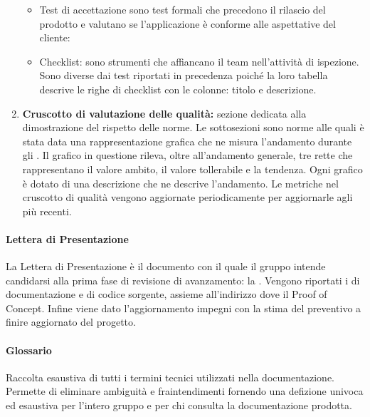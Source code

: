 \begin{enumerate}
\begin{itemize}
    \item Test di accettazione sono test formali che precedono il rilascio del prodotto e valutano se l’applicazione è conforme alle aspettative del cliente:
    \item Checklist: sono strumenti che affiancano il team nell'attività di ispezione. Sono diverse dai test riportati in precedenza poiché la loro tabella descrive le righe di checklist con le colonne: titolo e descrizione.
  \end{itemize}
  \item \textbf{Cruscotto di valutazione delle qualità:} sezione dedicata alla dimostrazione del rispetto delle norme. Le sottosezioni sono norme alle quali è stata data una rappresentazione grafica che ne misura l'andamento durante gli . Il grafico in questione rileva, oltre all'andamento generale, tre rette che rappresentano il valore ambito, il valore tollerabile e la tendenza. Ogni grafico è dotato di una descrizione che ne descrive l'andamento. Le metriche nel cruscotto di qualità vengono aggiornate periodicamente per aggiornarle agli  più recenti.
\end{enumerate}

\paragraph{Lettera di Presentazione}
La Lettera di Presentazione è il documento con il quale il gruppo intende candidarsi alla prima fase di revisione di avanzamento: la \RTB. Vengono riportati i  di documentazione e di codice sorgente, assieme all'indirizzo dove il Proof of Concept. Infine viene dato l'aggiornamento impegni con la stima del preventivo a finire aggiornato del progetto.

\paragraph{Glossario}
Raccolta esaustiva di tutti i termini tecnici utilizzati nella documentazione. Permette di eliminare ambiguità e fraintendimenti fornendo una defizione univoca ed esaustiva per l'intero gruppo e per chi consulta la documentazione prodotta.

